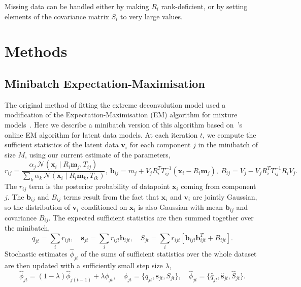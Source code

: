 \documentclass{article}
\newcommand{\bx}{\mathbf{x}}
\newcommand{\bv}{\mathbf{v}}
\newcommand{\bm}{\mathbf{m}}
\newcommand{\bb}{\mathbf{b}}
\newcommand{\bs}{\mathbf{s}}
\begin{document}
Missing data can be handled either by making $R_i$ rank-deficient, or by setting elements of the covariance matrix $S_i$ to very large values.

\section{Methods}

\subsection{Minibatch Expectation-Maximisation}
\label{sec:minibatch-em}
The original method of fitting the extreme deconvolution model used a modification of the Expectation-Maximisation (EM) algorithm for mixture models~\cite{dempsterMaximumLikelihoodIncomplete1977}.
Here we describe a minibatch version of this algorithm based on~\citet{cappeOnlineExpectationMaximization2009}'s online EM algorithm for latent data models.
At each iteration $t$, we compute the sufficient statistics of the latent data $\bv_i$ for each component $j$ in the minibatch of size $M$, using our current estimate of the parameters,
\begin{equation}
r_{ij} = \frac{\alpha_{j} \,\mathcal{N}(\bx_i \mid R_i\bm_j, T_{ij})}{\sum_k \alpha_k \,\mathcal{N}(\bx_i \mid R_i\bm_k, T_{ik})}, \ 
\bb_{ij} = m_j + V_j R_i^T T_{ij}^{-1}(\bx_i - R_i \bm_j), \ 
B_{ij} = V_j - V_j R_i^T T_{ij}^{-1}R_iV_j.
\end{equation}
The $r_{ij}$ term is the posterior probability of datapoint $\bx_i$ coming from component $j$.
The $\bb_{ij}$ and $B_{ij}$ terms result from the fact that $\bx_i$ and $\bv_i$ are jointly Gaussian, so the distribution of $\bv_i$ conditioned on $\bx_i$ is also Gaussian with mean $\bb_{ij}$ and covariance $B_{ij}$.
The expected sufficient statistics are then summed together over the minibatch,
\begin{equation}
q_{jt} = \sum_i r_{ijt}, \quad
\bs_{jt} = \sum_i r_{ijt} \bb_{ijt}, \quad
S_{jt} = \sum_i r_{ijt} [\bb_{ijt}\bb_{ijt}^T + B_{ijt}].
\end{equation}
Stochastic estimates $\hat{\phi}_{jt} $ of the sums of sufficient statistics over the whole dataset are then updated with a sufficiently small step size $\lambda$,
\begin{equation}
\hat{\phi}_{jt} = (1 - \lambda)\hat{\phi}_{j(t-1)} + \lambda \phi_{jt},\quad
\phi_{jt} = \{q_{jt}, \bs_{jt}, S_{jt} \},\quad
\hat{\phi}_{jt} = \{\hat{q}_{jt}, \hat{\bs}_{jt}, \hat{S}_{jt} \}. \label{eq:sums}
\end{equation}
\end{document}
